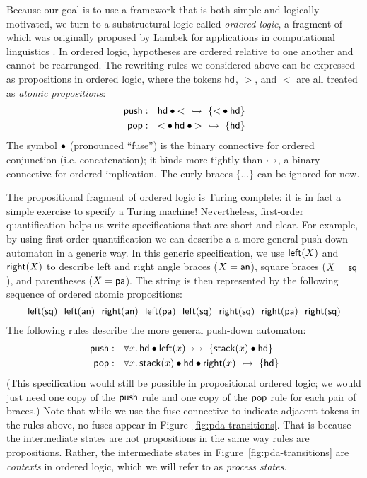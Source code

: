 Because our goal is to use a framework that is both simple and
logically motivated, we turn to a substructural logic called {\it
  ordered logic}, a fragment of which was originally proposed by
Lambek for applications in computational
linguistics \cite{lambek58mathematics}. In ordered logic, hypotheses
are ordered relative to one another and
cannot be rearranged. The rewriting rules we considered
above can be expressed as propositions in ordered logic, where the
tokens ${\sf hd}$, $>$, and $<$ are all treated as {\it atomic
  propositions}:
\begin{align*}
{\sf push} &: ~~ {\sf hd} \mathbin{\bullet} {<} ~\rightarrowtail~ \{ {<} \mathbin{\bullet} {\sf hd} \}
\\ 
{\sf pop} &: ~~ {<} \mathbin{\bullet} {\sf hd} \mathbin{\bullet} {>} ~\rightarrowtail~ \{ {\sf hd} \}
\end{align*}
The symbol $\mathbin{\bullet}$ (pronounced ``fuse'') is the binary connective for
ordered conjunction (i.e. concatenation); it binds more tightly than
$\rightarrowtail$, a binary connective for ordered implication. The curly
braces $\{ \ldots \}$ can be ignored for now.

The propositional fragment of ordered logic is
Turing complete: it is in fact
a simple exercise to specify a Turing machine!
Nevertheless, first-order quantification helps us write
specifications that are short and clear. For example, by using
first-order quantification we can describe a 
a more general push-down automaton in a generic way. In
this generic specification, we use ${\sf left}(X)$
and ${\sf right}(X)$ to describe left and right angle braces ($X =
{\sf an}$), square braces ($X = {\sf sq}$), and parentheses ($X = {\sf
  pa}$). The string \obj{\mbox{{\sf [ \textless~\textgreater~( [ ] ) ]}}} 
is then
represented by the following sequence of ordered atomic propositions:
\[
{\sf 
  left(sq) ~~
  left(an) ~~
  right(an) ~~
  left(pa) ~~
  left(sq) ~~
  right(sq) ~~
  right(pa) ~~
  right(sq)
}
\]
The following rules describe the more general push-down automaton:
\begin{align*}
{\sf push} &: ~~ \forall x.\, 
  {\sf hd} \mathbin{\bullet} {\sf left}(x) ~\rightarrowtail~ \{ {\sf stack}(x) \mathbin{\bullet} {\sf hd} \}
\\ 
{\sf pop} &: ~~ \forall x.\, 
  {\sf stack}(x) \mathbin{\bullet} {\sf hd} \mathbin{\bullet} {\sf right}(x) ~\rightarrowtail~ \{ {\sf hd} \}
\end{align*}
(This specification would still be possible in propositional ordered 
logic; we would just need one copy of the ${\sf push}$ rule and one copy
of the ${\sf pop}$ rule for each pair of braces.)
Note that while we use the fuse connective to indicate adjacent tokens
in the rules above, no fuses appear in
Figure~\ref{fig:pda-transitions}. That is because the intermediate
states are not propositions in the same way rules are
propositions. Rather, the intermediate states in
Figure~\ref{fig:pda-transitions} are {\it contexts} in ordered logic,
which we will refer to as {\it process states}. 


